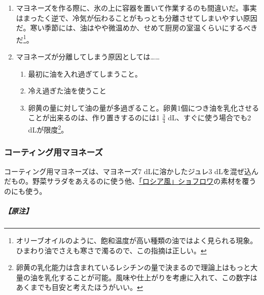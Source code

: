 \begin{recette}
\begin{enumerate}
\def\labelenumi{\arabic{enumi}.}
\setcounter{enumi}{1}
\item
  マヨネーズを作る際に、氷の上に容器を置いて作業するのも間違いだ。事実はまったく逆で、冷気が伝わることがもっとも分離させてしまいやすい原因だ。寒い季節には、油はやや微温めか、せめて厨房の室温くらいにするべきだ\footnote{オリーブオイルのように、飽和温度が高い種類の油ではよく見られる現象。ひまわり油でさえも寒さで濁るので、この指摘は正しい。}。
\item
  マヨネーズが分離してしまう原因としては\ldots{}\ldots{}

  \begin{enumerate}
  \def\labelenumii{\arabic{enumii}.}
  \tightlist
  \item
    最初に油を入れ過ぎてしまうこと。
  \item
    冷え過ぎた油を使うこと
  \item
    卵黄の量に対して油の量が多過ぎること。卵黄1個につき油を乳化させることが出来るのは、作り置きするのには1
    \(\frac{3}{4}\) dL、すぐに使う場合でも2 dLが限度\footnote{卵黄の乳化能力は含まれているレシチンの量で決まるので理論上はもっと大量の油を乳化することが可能。風味や仕上がりを考慮に入れて、この数字はあくまでも目安と考えたほうがいい。}。
  \end{enumerate}
\end{enumerate}

\hypertarget{mayonnaise-collee}{%
\subsubsection{コーティング用マヨネーズ}\label{mayonnaise-collee}}



コーティング用マヨネーズは、マヨネーズ7 dLに溶かしたジュレ3
dLを混ぜ込んだもの。野菜サラダをあえるのに使う他、\protect\hyperlink{}{「ロシア風」ショフロワ}の素材を覆うのにも使う。

\hypertarget{nota-mayonnaise-collee}{%
\subparagraph{【原注】}\label{nota-mayonnaise-collee}}


\end{recette}

